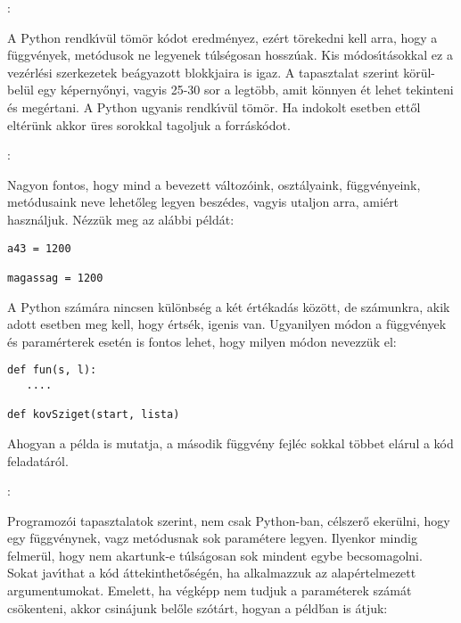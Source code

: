 :

A Python rendk\'{\i}v\"ul t\"om\"or k\'odot eredm\'enyez, ez\'ert t\"orekedni kell arra, hogy a f\"uggv\'enyek, 
met\'odusok ne legyenek t\'uls\'egosan hossz\'uak. Kis m\'odo\-s\'{\i}\-t\'a\-sok\-kal ez a vez\'erl\'esi 
szerkezetek be\'agyazott blokkjaira is igaz. A tapasztalat szerint k\"or\"ul-bel\"ul egy k\'eperny\H{o}nyi, 
vagyis 25-30 sor a legt\"obb, amit k\"onnyen \'et lehet tekinteni \'es meg\'ertani. A Python ugyanis 
rendk\'{\i}v\"ul t\"om\"or. Ha indokolt esetben ett\H{o}l elt\'er\"unk akkor \"ures sorokkal tagoljuk a 
forr\'ask\'odot.

:

Nagyon fontos, hogy mind a bevezett v\'altoz\'oink, oszt\'alyaink, f\"uggv\'enyeink, met\'odusaink neve lehet\H{o}leg 
legyen besz\'edes, vagyis utaljon arra, ami\'ert hasz\-n\'al\-juk. N\'ezz\"uk meg az al\'abbi p\'eld\'at:

\begin{Verbatim}[fontsize=\small]
a43 = 1200

magassag = 1200
\end{Verbatim}

\noindent A Python sz\'am\'ara nincsen k\"ul\"onbs\'eg a k\'et \'ert\'ekad\'as k\"oz\"ott, de sz\'amunkra, akik 
adott esetben meg kell, hogy \'erts\'ek, igenis van. Ugyanilyen m\'odon a f\"uggv\'enyek \'es param\'erterek 
eset\'en is fontos lehet, hogy milyen m\'odon nevezz\"uk el:

\begin{Verbatim}[fontsize=\small]
def fun(s, l):
   ....

def kovSziget(start, lista)
\end{Verbatim}

\noindent Ahogyan a p\'elda is mutatja, a m\'asodik f\"uggv\'eny fejl\'ec sokkal t\"obbet el\'arul a 
k\'od feladat\'ar\'ol.

:

Programoz\'oi tapasztalatok szerint, nem csak Python-ban, c\'elszer\H{o} eker\"ulni, hogy egy 
f\"uggv\'enynek, vagz met\'odusnak sok param\'etere legyen. Ilyenkor mindig felmer\"ul, hogy 
nem akartunk-e t\'uls\'agosan sok mindent egybe becsomagolni. Sokat jav\'{\i}that a k\'od 
\'attekinthet\H{o}s\'eg\'en, ha alkalmazzuk az alap\'ertelmezett argumentumokat. Emelett, ha 
v\'egk\'epp nem tudjuk a param\'eterek sz\'am\'at cs\"okenteni, akkor csin\'ajunk bel\H{o}le 
sz\'ot\'art, hogyan a p\'eld\'ban is \'atjuk:

